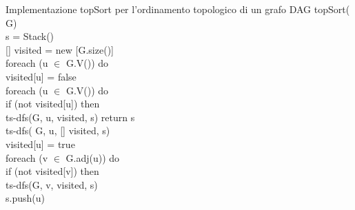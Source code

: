 \begin{minicode}{Implementazione topSort per l'ordinamento topologico di un grafo DAG}
\ind{} topSort( G)\\
     s = Stack()\\
    [] visited = new [G.size()]\\
    \indf foreach (u $\in$ G.V()) do\\
        visited[u] = false\\
    \indf foreach (u $\in$ G.V()) do\\
        \indff if (not visited[u]) then\\
            ts-dfs(G, u, visited, s)\hfill{}
    \indf return s\\

\rmbreak\ind ts-dfs( G,  u, [] visited,  s)\\
    visited[u] = true\\
    \indf foreach (v $\in$ G.adj(u)) do\\
        \indff if (not visited[v]) then\\
            ts-dfs(G, v, visited, s)\\
    \indf s.push(u)
\end{minicode}

